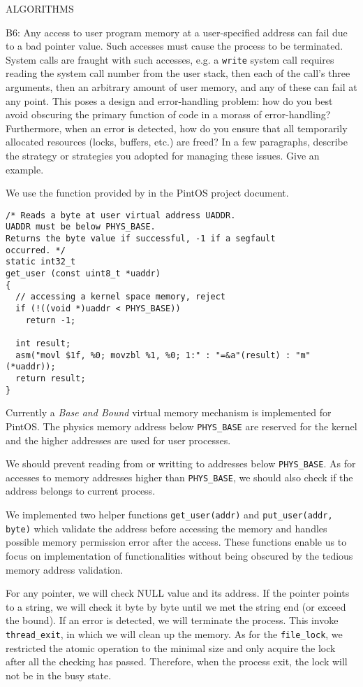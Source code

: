 \begin{aspect}{ALGORITHMS}
	\begin{qc}
		B6: Any access to user program memory at a user-specified address can fail due to a bad pointer value.
		Such accesses must cause the process to be terminated.
		System calls are fraught with such accesses,
		e.g. a \lstinline{write} system call requires reading the system call number from the user stack,
		then each of the call's three arguments, then an arbitrary amount of user memory, and any of these can fail at any point.
		This poses a design and error-handling problem: how do you best avoid obscuring the primary function of code in a morass of error-handling?
		Furthermore, when an error is detected, how do you ensure that all temporarily allocated resources (locks, buffers, etc.) are freed?
		In a few paragraphs, describe the strategy or strategies you adopted for managing these issues.
		Give an example.
	\end{qc}
	We use the function provided by in the PintOS project document.
	\begin{lstlisting}
/* Reads a byte at user virtual address UADDR.
UADDR must be below PHYS_BASE.
Returns the byte value if successful, -1 if a segfault
occurred. */
static int32_t
get_user (const uint8_t *uaddr)
{
  // accessing a kernel space memory, reject
  if (!((void *)uaddr < PHYS_BASE))
    return -1;

  int result;
  asm("movl $1f, %0; movzbl %1, %0; 1:" : "=&a"(result) : "m"(*uaddr));
  return result;
}
	\end{lstlisting}
	Currently a \emph{Base and Bound} virtual memory mechanism is implemented for PintOS.
	The physics memory address below \lstinline{PHYS_BASE} are reserved for the kernel and the higher addresses are used for user processes.

	We should prevent reading from or writting to addresses below \lstinline{PHYS_BASE}.
	As for accesses to memory addresses higher than \lstinline{PHYS_BASE}, we should also check if the address belongs to current process.

	We implemented two helper functions \lstinline{get_user(addr)} and \lstinline{put_user(addr, byte)}
	which validate the address before accessing the memory and handles possible memory permission error after the access.
	These functions enable us to focus on implementation of functionalities without being obscured by the tedious memory address validation.

	For any pointer, we will check NULL value and its address. If the pointer points to a string, we will check it byte by byte until we met the string end (or exceed the bound). If an error is detected, we will terminate the process. This invoke \lstinline{thread_exit}, in which we will clean up the memory. As for the \lstinline{file_lock}, we restricted the atomic operation to the minimal size and only acquire the lock after all the checking has passed. Therefore, when the process exit, the lock will not be in the busy state.


\end{aspect}
